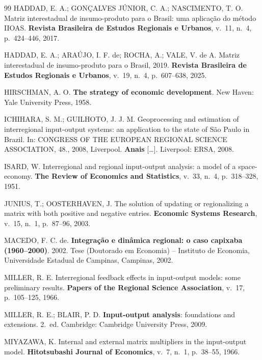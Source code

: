 \documentclass[11pt,a4paper]{article}
\begin{document}
\begin{thebibliography}{99}
HADDAD, E. A.; GONÇALVES JÚNIOR, C. A.; NASCIMENTO, T. O. Matriz interestadual de
insumo-produto para o Brasil: uma aplicação do método IIOAS. \textbf{Revista
Brasileira de Estudos Regionais e Urbanos}, v.~11, n.~4, p.~424--446, 2017.

HADDAD, E. A.; ARAÚJO, I. F. de; ROCHA, A.; VALE, V. de A. Matriz interestadual de
insumo-produto para o Brasil, 2019. \textbf{Revista Brasileira de Estudos
Regionais e Urbanos}, v.~19, n.~4, p.~607--638, 2025.

HIRSCHMAN, A. O. \textbf{The strategy of economic development}. New Haven: Yale
University Press, 1958.

ICHIHARA, S. M.; GUILHOTO, J. J. M. Geoprocessing and estimation of interregional
input-output systems: an application to the state of São Paulo in Brazil. In:
CONGRESS OF THE EUROPEAN REGIONAL SCIENCE ASSOCIATION, 48., 2008, Liverpool.
\textbf{Anais} [\ldots]. Liverpool: ERSA, 2008.

ISARD, W. Interregional and regional input-output analysis: a model of a
space-economy. \textbf{The Review of Economics and Statistics}, v.~33, n.~4,
p.~318--328, 1951.

JUNIUS, T.; OOSTERHAVEN, J. The solution of updating or regionalizing a matrix
with both positive and negative entries. \textbf{Economic Systems Research},
v.~15, n.~1, p.~87--96, 2003.

MACEDO, F. C. de. \textbf{Integração e dinâmica regional: o caso capixaba
(1960--2000)}. 2002. Tese (Doutorado em Economia) -- Instituto de Economia,
Universidade Estadual de Campinas, Campinas, 2002.

MILLER, R. E. Interregional feedback effects in input-output models: some
preliminary results. \textbf{Papers of the Regional Science Association}, v.~17,
p.~105--125, 1966.

MILLER, R. E.; BLAIR, P. D. \textbf{Input-output analysis}: foundations and
extensions. 2.~ed. Cambridge: Cambridge University Press, 2009.

MIYAZAWA, K. Internal and external matrix multipliers in the input-output model.
\textbf{Hitotsubashi Journal of Economics}, v.~7, n.~1, p.~38--55, 1966.


\end{thebibliography}
\end{document}
